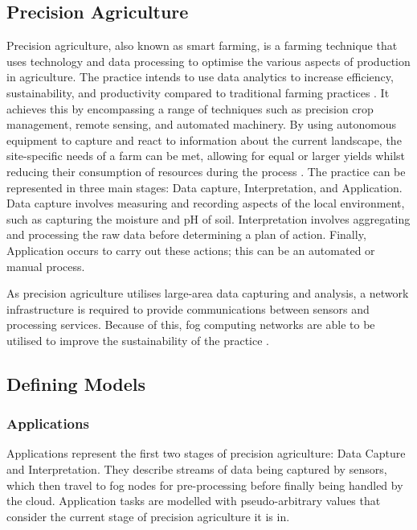\documentclass{l4proj}
\begin{document}
\subsection{Precision Agriculture}\label{eval:subsec:precision-agriculture}
Precision agriculture, also known as smart farming, is a farming technique that uses technology and data processing to optimise the various aspects of production in agriculture.
The practice intends to use data analytics to increase efficiency, sustainability, and productivity compared to traditional farming practices \citep{precison-agriculture}.
It achieves this by encompassing a range of techniques such as precision crop management, remote sensing, and automated machinery.
By using autonomous equipment to capture and react to information about the current landscape, the site-specific needs of a farm can be met, allowing for equal or larger yields whilst reducing their consumption of resources during the process \citep{precison-agriculture}.
The practice can be represented in three main stages: Data capture, Interpretation, and Application.
Data capture involves measuring and recording aspects of the local environment, such as capturing the moisture and pH of soil.
Interpretation involves aggregating and processing the raw data before determining a plan of action.
Finally, Application occurs to carry out these actions; this can be an automated or manual process.

As precision agriculture utilises large-area data capturing and analysis, a network infrastructure is required to provide communications between sensors and processing services.
Because of this, fog computing networks are able to be utilised to improve the sustainability of the practice \citep{fog_smart_farming}.

\subsection{Defining Models}\label{eval:subsec:modelling}

\subsubsection{Applications}
Applications represent the first two stages of precision agriculture: Data Capture and Interpretation.
They describe streams of data being captured by sensors, which then travel to fog nodes for pre-processing before finally being handled by the cloud.
Application tasks are modelled with pseudo-arbitrary values that consider the current stage of precision agriculture it is in.
\end{document}
